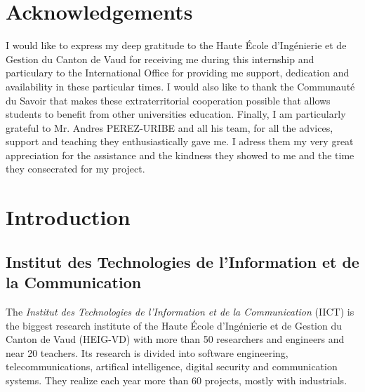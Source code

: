 \documentclass[12pt, a4paper]{report}
\begin{document}
	\makeutbmfrontcover{}

	{
	\hypersetup{linkcolor=black}
	\tableofcontents{}
	}
	
	\printglossary
	
	\newpage
	\chapter*{Acknowledgements}
	I would like to express my deep gratitude to the Haute École d'Ingénierie et de Gestion du Canton de Vaud for receiving me during this internship and particulary to the International Office for providing me support, dedication and availability in these particular times.
	I would also like to thank the Communauté du Savoir that makes these extraterritorial cooperation possible that allows students to benefit from other universities education.
	Finally, I am particularly grateful to Mr. Andres PEREZ-URIBE and all his team, for all the advices, support and teaching they enthusiastically gave me.
	I adress them my very great appreciation for the assistance and the kindness they showed to me and the time they consecrated for my project.

	
	\chapter{Introduction}
		\section{Institut des Technologies de l’Information et de la Communication}
			The {\itshape Institut des Technologies de l’Information et de la Communication} (IICT) is the biggest research institute of the Haute École d'Ingénierie et de Gestion du Canton de Vaud (HEIG-VD) with more than 50 researchers and engineers and near 20 teachers.
			Its research is divided into software engineering, telecommunications, artifical intelligence, digital security and communication systems.
			They realize each year more than 60 projects, mostly with industrials.\\
			
\end{document}
